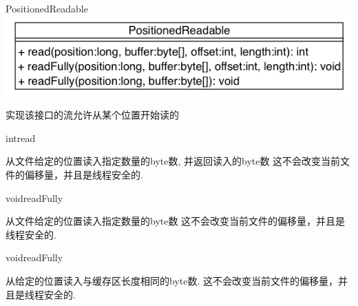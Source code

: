 \begin{XeClass}{PositionedReadable}
\includegraphics[width=\textwidth]{cdig/PositionedReadable.png}
     
 实现该接口的流允许从某个位置开始读的

    \begin{XeMethod}{\XePublic}{int}{read}
         
 从文件给定的位置读入指定数量的byte数, 并返回读入的byte数
 这不会改变当前文件的偏移量，并且是线程安全的.

    \end{XeMethod}

    \begin{XeMethod}{\XePublic}{void}{readFully}
         
 从文件给定的位置读入指定数量的byte数
 这不会改变当前文件的偏移量，并且是线程安全的.

    \end{XeMethod}

    \begin{XeMethod}{\XePublic}{void}{readFully}
         
 从给定的位置读入与缓存区长度相同的byte数.
 这不会改变当前文件的偏移量，并且是线程安全的.

    \end{XeMethod}

\end{XeClass}
